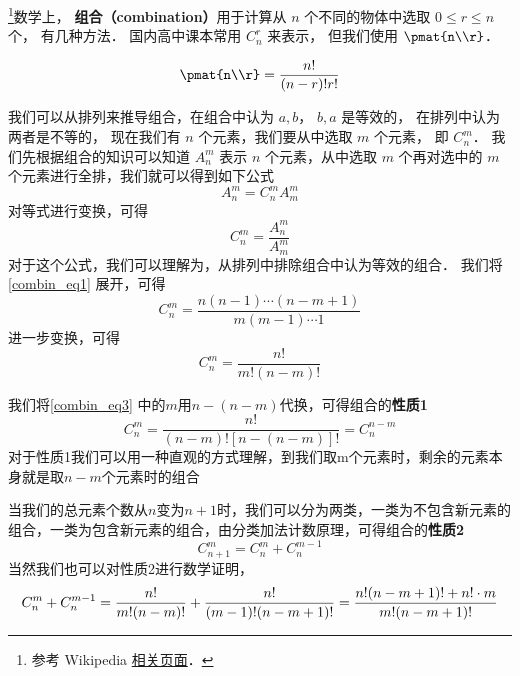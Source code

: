 
\begin{issues}
\issueDraft
\end{issues}


\footnote{参考 Wikipedia \href{https://en.wikipedia.org/wiki/Combination}{相关页面}．}数学上， \textbf{组合（combination）}用于计算从 $n$ 个不同的物体中选取 $0 \leqslant r \leqslant n$ 个， 有几种方法． 国内高中课本常用 $C_n^r$ 来表示， 但我们使用 $\pmat{n\\r}$．

\begin{equation}
\pmat{n\\r} = \frac{n!}{(n-r)!r!}
\end{equation}

我们可以从排列来推导组合，在组合中认为 ${a,b}$， ${b,a}$ 是等效的， 在排列中认为两者是不等的， 现在我们有 $n$ 个元素，我们要从中选取 $m$ 个元素， 即 $C_n^m$．
我们先根据组合的知识可以知道 $A_n^m$ 表示 $n$ 个元素，从中选取 $m$ 个再对选中的 $m$ 个元素进行全排，我们就可以得到如下公式
\begin{equation}
A_n^m = C_n^m A_m^m
\end{equation}
对等式进行变换，可得
\begin{equation}\label{combin_eq1}
C_n^m = \frac{A_n^m}{A_m^m}
\end{equation}
对于这个公式，我们可以理解为，从排列中排除组合中认为等效的组合．
我们将\autoref{combin_eq1} 展开，可得
\begin{equation}\label{combin_eq2}
C_n^m = \frac{n(n - 1) \cdots (n - m + 1)}{m(m-1)\cdots 1}
\end{equation}
进一步变换，可得
\begin{equation}\label{combin_eq3}
C_n^m = \frac{n!}{m!(n-m)!}
\end{equation}

我们将\autoref{combin_eq3} 中的$m$用$n-(n-m)$代换，可得组合的\textbf{性质1}
\begin{equation}
C_n^m = \frac{n!}{(n-m)![n-(n-m)]!} = C_n^{n-m}
\end{equation}
对于性质1我们可以用一种直观的方式理解，到我们取m个元素时，剩余的元素本身就是取$n-m$个元素时的组合

当我们的总元素个数从$n$变为$n+1$时，我们可以分为两类，一类为不包含新元素的组合，一类为包含新元素的组合，由分类加法计数原理，可得组合的\textbf{性质2}
\begin{equation}
C_{n + 1}^m = C_n^m + C_n^{m - 1}
\end{equation}
当然我们也可以对性质2进行数学证明，
\begin{equation}
C_n^m + C_n^{m - 1} = \frac{n!}{m!(n-m)!} + \frac{n!}{(m - 1)!(n - m + 1)!}\\=\frac{n!(n - m + 1)! + n!\cdot m}{m!(n - m +1)!}
\end{equation}